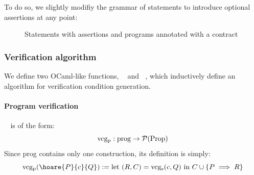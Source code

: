 \documentclass[toc]{../cs-classes/cs-classes}
\DeclareMathOperator{\vcgp}{vcg_p}
\DeclareMathOperator{\vcgs}{vcg_s}
\begin{document}
To do so, we slightly modifiy the grammar of statements to introduce optional assertions at any point:
\begin{figure}[H]
    \centering
    \begin{grammar}
        \gskip{}
    \end{grammar}
    \caption{Statements with assertions and programs annotated with a contract}
\end{figure}

\subsubsection{Verification algorithm}
We define two OCaml-like functions, $\vcgp$ and $\vcgs$, which inductively define an algorithm for verification condition generation.

\paragraph*{Program verification} 
$\vcgp$ is of the form:
\begin{equation*}
    \vcgp : \textnormal{prog} \rightarrow \mathcal{P}(\textnormal{Prop})
\end{equation*}
Since prog contains only one construction, its definition is simply:
\begin{equation*}
    \vcgp(\hoare{P}{c}{Q}) := \textnormal{let } (R, C) = \vcgs(c, Q) \textnormal{ in } C\cup\{P\implies R\}
\end{equation*}
\end{document}
